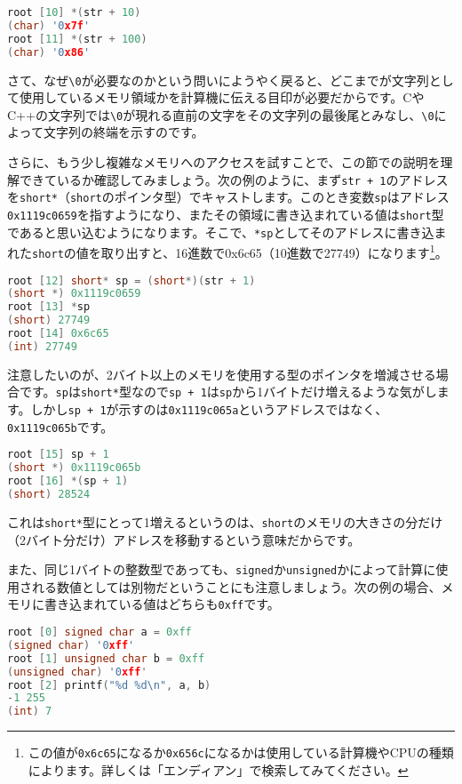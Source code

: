 \begin{lstlisting}[language=c++]
root [10] *(str + 10)
(char) '0x7f'
root [11] *(str + 100)
(char) '0x86'
\end{lstlisting}

さて、なぜ\texttt{\textbackslash{}0}が必要なのかという問いにようやく戻ると、どこまでが文字列として使用しているメモリ領域かを計算機に伝える目印が必要だからです。CやC++の文字列では\texttt{\textbackslash{}0}が現れる直前の文字をその文字列の最後尾とみなし、\texttt{\textbackslash{}0}によって文字列の終端を示すのです。

さらに、もう少し複雑なメモリへのアクセスを試すことで、この節での説明を理解できているか確認してみましょう。次の例のように、まず\texttt{str + 1}のアドレスを\texttt{short*}（\texttt{short}のポインタ型）でキャストします。このとき変数\texttt{sp}はアドレス\texttt{0x1119c0659}を指すようになり、またその領域に書き込まれている値は\texttt{short}型であると思い込むようになります。そこで、\texttt{*sp}としてそのアドレスに書き込まれた\texttt{short}の値を取り出すと、16進数で0x6c65（10進数で27749）になります\footnote{この値が\texttt{0x6c65}になるか\texttt{0x656c}になるかは使用している計算機やCPUの種類によります。詳しくは「エンディアン」で検索してみてください。}。

\begin{lstlisting}[language=c++]
root [12] short* sp = (short*)(str + 1)
(short *) 0x1119c0659
root [13] *sp
(short) 27749
root [14] 0x6c65
(int) 27749
\end{lstlisting}

注意したいのが、2バイト以上のメモリを使用する型のポインタを増減させる場合です。\texttt{sp}は\texttt{short*}型なので\texttt{sp + 1}は\texttt{sp}から1バイトだけ増えるような気がします。しかし\texttt{sp + 1}が示すのは\texttt{0x1119c065a}というアドレスではなく、\texttt{0x1119c065b}です。
\begin{lstlisting}[language=c++]
root [15] sp + 1
(short *) 0x1119c065b
root [16] *(sp + 1)
(short) 28524
\end{lstlisting}
これは\texttt{short*}型にとって1増えるというのは、\texttt{short}のメモリの大きさの分だけ（2バイト分だけ）アドレスを移動するという意味だからです。

また、同じ1バイトの整数型であっても、\texttt{signed}か\texttt{unsigned}かによって計算に使用される数値としては別物だということにも注意しましょう。次の例の場合、メモリに書き込まれている値はどちらも\texttt{0xff}です。
\begin{lstlisting}[language=c++]
root [0] signed char a = 0xff
(signed char) '0xff'
root [1] unsigned char b = 0xff
(unsigned char) '0xff'
root [2] printf("%d %d\n", a, b)
-1 255
(int) 7
\end{lstlisting}


